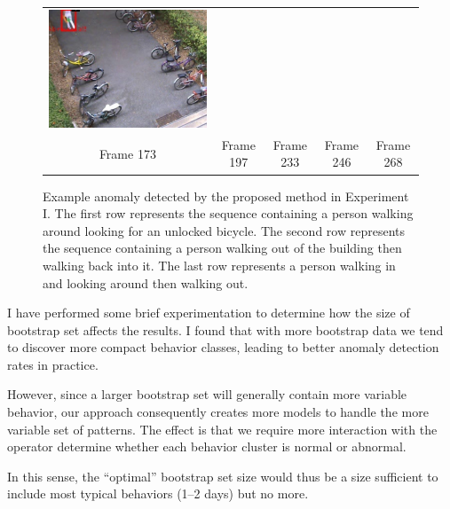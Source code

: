 \begin{figure}[t]
\begin{tabular}{ccccc}
    \includegraphics[scale=0.24]{figures/case-3-suspicious-0268} \\
    \small Frame 173 & 
    \small Frame 197 & 
    \small Frame 233 & 
    \small Frame 246 & 
    \small Frame 268
  \end{tabular}
  \caption[Example anomaly detected by the proposed method in
    Experiment I.]{\small Example anomaly detected by the proposed
    method in Experiment I.  The first row represents the sequence 
    containing a person walking around looking for an unlocked 
    bicycle. The second row represents the sequence containing a 
    person walking out of the building then walking back into it. 
    The last row represents a person walking in and looking around 
    then walking out.}
  \label{fig:suspicious-behavior-detected}
\end{figure}

I have performed some brief experimentation to determine how the 
size of bootstrap set affects the results. I found that with more bootstrap 
data we tend to discover more compact behavior classes, leading to better 
anomaly detection rates in practice.

However, since a larger bootstrap set will generally contain more 
variable behavior, our approach consequently creates more models to 
handle the more variable set of patterns. The effect is that we
require more interaction with the operator determine whether each 
behavior cluster is normal or abnormal.

In this sense, the ``optimal'' bootstrap set size would thus be a 
size sufficient to include most typical behaviors (1--2 days) but 
no more.

